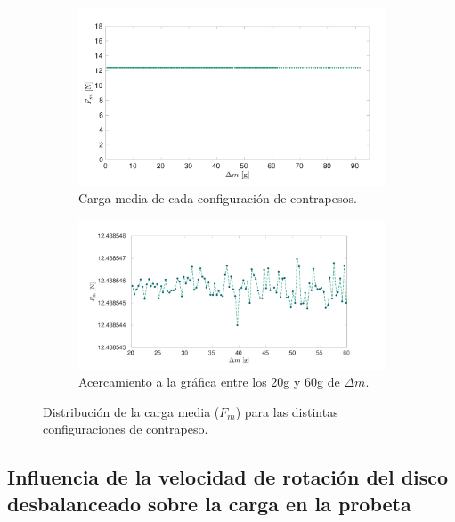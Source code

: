 \begin{figure}[H]
\centering
	\begin{subfigure}{1\linewidth}
		\centering
		\includegraphics[width=1\linewidth]{Imagenes/fm_dm.pdf}
		\caption{Carga media de cada configuración de contrapesos.}\label{fig:fm_dm}
	\end{subfigure}
	\begin{subfigure}{1\linewidth}
		\centering
		\includegraphics[width=1\linewidth]{Imagenes/fm_dmsp.pdf}
		\caption{Acercamiento a la gráfica entre los 20g y 60g de $\Delta m$. }\label{fig:fm_dmsp}
	\end{subfigure}
\par\bigskip
\caption{Distribución de la carga media ($F_m$) para las distintas configuraciones de contrapeso.}
\label{fig:velt_12}
\end{figure}

\newpage

\subsection{Influencia de la velocidad de rotación del disco desbalanceado sobre la carga en la probeta}

